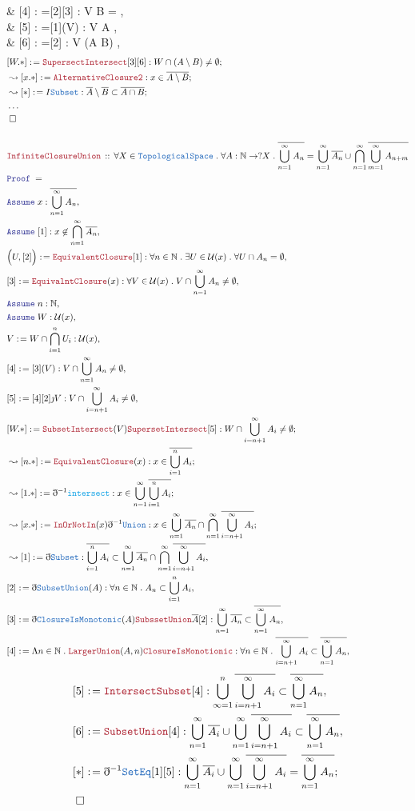 \documentclass[12pt]{scrartcl}
\newcommand{\TYPE}[1]{\textcolor{NavyBlue}{\mathtt{#1}}}
\newcommand{\FUNC}[1]{\textcolor{Cerulean}{\mathtt{#1}}}
\newcommand{\LOGIC}[1]{\textcolor{Blue}{\mathtt{#1}}}
\newcommand{\THM}[1]{\textcolor{Maroon}{\mathtt{#1}}}
\renewcommand{\.}{\; . \;}
\newcommand{\de}{: \kern 0.1pc =}
\newcommand{\Theorem}[2]{& \THM{#1} \, :: \, #2 \\ & \Proof = \\ }
\newcommand{\Page}[1]{ \begin{align*} #1 \end{align*}   }
\newcommand{ \bd }{ \ByDef }
\newcommand{\NoProof}{ & \ldots \\ \EndProof}
\newcommand{\Nat}{\mathbb{N} }
\newcommand{\Say}[3]{& #1 \de #2 : #3, \\}
\newcommand{\Conclude}[3]{& #1 \de #2 : #3; \\}
\newcommand{\Derive}[3]{& \leadsto #1 \de #2 : #3, \\}
\newcommand{\DeriveConclude}[3]{& \leadsto #1 \de #2 : #3 ; \\}
\newcommand{\Assume}[2]{& \LOGIC{Assume} \; #1 : #2, \\}
\newcommand{\QED}{\; \square}
\newcommand{\EndProof}{& \QED \\}
\newcommand{\ByDef}{\eth}
\newcommand{\ByConstr}{\jmath}
\newcommand{\Proof}{\LOGIC{Proof} \; }
\newcommand{\TS}{\TYPE{TopologicalSpace}}
\newcommand{\U}{\mathcal{U}}
\begin{document}
{	\Say{[4]}{[2][3]\THM{SubsetIntersect}}{V \cap B = \emptyset}
	\Say{[5]}{[1](V)}{V \cap A \neq \emptyset}
	\Say{[6]}{[2]}{ V \cap (A \setminus B) \neq \emptyset }
}\Page{	
	\Conclude{[W.*]}{\THM{SupersectIntersect}[3][6]}
	{ W \cap (A \setminus B) \neq \emptyset  }
	\DeriveConclude{[x.*]}{\THM{AlternativeClosure2}}
	{ x \in \overline{A\setminus B}}
	\DeriveConclude{[*]}{ I \TYPE{Subset} }
	{ 
		\overline{A} \setminus \overline{B} 
		\subset
		\overline{A \cap B}
	}
	\NoProof
	\\
	\Theorem{InfiniteClosureUnion}
	{
		\forall X \in \TS \.
		\forall A : \Nat \to ?X \.
		\overline{\bigcup^\infty_{n=1} A_n} = 
		\bigcup^{\infty}_{n=1} \overline{A_n} \cup 
		\bigcap^\infty_{n=1} \overline{\bigcup^\infty_{m=1} A_{n+m}} 
	}
	\Assume{x}{\overline{\bigcup^\infty_{n=1} A_n}} 
	\Assume{[1]}{x \not \in \bigcap^\infty_{n=1} \overline{A_n}}
	\Say{\Big( U,[2]\Big)}{\THM{EquivalentClosure}[1]}{
		\forall n \in \Nat \. 
		\exists U \in \U(x) \.
		\forall U \cap A_n = \emptyset
	}
	\Say{[3]}{\THM{EquivalntClosure}(x)}
	{
		\forall V \in \U(x) \.
		V \cap \bigcup^\infty_{n=1} A_n  \neq \emptyset	
	}
	\Assume{n}{\Nat}
	\Assume{W}{\U(x)}
	\Say{V}{W \cap \bigcap^n_{i=1} U_i}{\U(x)}
	\Say{[4]}{[3](V)}{V \cap \bigcup^\infty_{n=1} A_n \neq \emptyset}
	\Say{[5]}{[4][2]\ByConstr V}{ V \cap \bigcup^\infty_{i= n + 1 } A_i \neq \emptyset}
	\Conclude{[W.*]}{\THM{SubsetIntersect}(V)\THM{SupersetIntersect}[5]}
	{ W \cap \bigcup^\infty_{i = n + 1} A_i \neq \emptyset    } 
	\DeriveConclude{[n.*]}{ \THM{EquivalentClosure}(x) }
	{  x \in \overline{\bigcup^n_{i=1} A_i}    }
	\DeriveConclude{[1.*]}{ \bd^{-1} \FUNC{intersect} }
	{
		x \in \bigcup^\infty_{n=1} \overline{\bigcup^n_{i=1} A_i} 
	}
	\DeriveConclude{[x.*]}{\THM{InOrNotIn}(x)\bd^{-1} \TYPE{Union}}
	{
		x \in \bigcup^\infty_{n=1} \overline{A_n} 
		\cap
		\bigcap^\infty_{n=1} \overline{\bigcup_{i=n+1}^\infty A_i } 
	}
	\Derive{[1]}{\bd \TYPE{Subset} }
	{
		\overline{\bigcup^n_{i=1} A_i} \subset 
		\bigcup^\infty_{n=1} \overline{A_n} 
		\cap
		\bigcap^\infty_{n=1} \overline{\bigcup_{i=n+1}^\infty A_i } 
	}
	\Say{[2]}{\bd \TYPE{SubsetUnion}(A)}
	{
		\forall n \in \Nat \. A_n \subset \bigcup^n_{i=1} A_i
	}
	\Say{[3]}{\bd \TYPE{ClosureIsMonotonic}(A)\THM{SubssetUnion}{\overline{A}}[2] }
	{
		\bigcup^\infty_{n=1} \overline{A_n} \subset 
		\overline{\bigcup^\infty_{n=1} A_n}
	} 
	\Say{[4]}{\Lambda n \in \Nat \. \THM{LargerUnion}(A,n) \THM{ClosureIsMonotionic}}
	{
		\forall n \in \Nat \.
		\overline{\bigcup^\infty_{i=n+1} A_i} \subset
		\overline{\bigcup^\infty_{n=1} A_n}
	}
}\Page{ 
	\Say{[5]}{ \THM{IntersectSubset}[4]  } 
	{
		\bigcup^n_{\infty=1} 
		\overline{\bigcup^\infty_{i=n+1} A_i} \subset
		\overline{\bigcup^\infty_{n=1} A_n}	
	}
	\Say{[6]}{ \THM{SubsetUnion}[4]  } 
	{
		\bigcup^\infty_{n=1} \overline{A_i}
		\cup
		\bigcup^\infty_{n=1} 
		\overline{\bigcup^\infty_{i=n+1} A_i} \subset
		\overline{\bigcup^\infty_{n=1} A_n}	
	}
	\Conclude{[*]}
	{
		\bd^{-1} \TYPE{SetEq} [1][5]
	}
	{
		\bigcup^\infty_{n=1} \overline{A_i}
		\cup
		\bigcup^\infty_{n=1} 
		\overline{\bigcup^\infty_{i=n+1} A_i} =
		\overline{\bigcup^\infty_{n=1} A_n}	
	}
	\EndProof
}
\newpage
\end{document}
